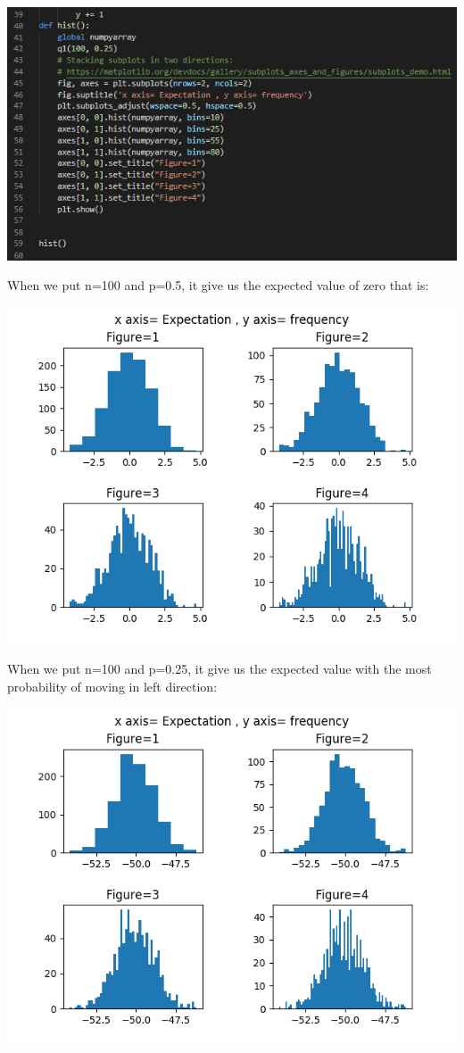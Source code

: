 \documentclass[answers]{exam}
\begin{document}
\begin{framed}
\begin{center}
    \includegraphics[scale=0.7]{task1.1b.PNG}
\end{center}
When we put n=100 and p=0.5, it give us the expected value of zero that is:  \begin{center}
    \includegraphics[scale=0.7]{hist1.1_p=0.5.png}
\end{center}
When we put n=100 and p=0.25, it give us the expected value with the most probability of moving in left direction: \begin{center}
    \includegraphics[scale=0.7]{hist1.1_p=0.25.png}

\end{center}
\end{framed}
\end{document}
